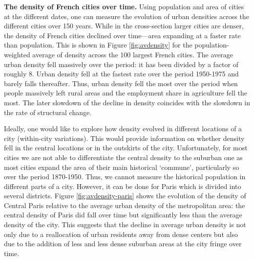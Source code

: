 \documentclass[./20250130-paper.tex]{subfiles}
\begin{document}
\textbf{The density of French cities over time.} Using population and area of cities at the different dates, one can measure the evolution of urban densities across the different cities over 150 years. While in the cross-section larger cities are denser, the density of French cities declined over time---area expanding at a faster rate than population. This is shown in Figure \ref{fig:avdensity} for the population-weighted average of density across the 100 largest French cities. The average urban density fell massively over the period: it has been divided by a factor of roughly 8. Urban density fell at the fastest rate over the period 1950-1975 and barely falls thereafter. Thus, urban density fell the most over the period when people massively left rural areas and the employment share in agriculture fell the most. The later slowdown of the decline in density coincides with the slowdown in the rate of structural change.%



Ideally, one would like to explore how density evolved in different locations of a city (within-city variations). This would provide information on whether density fell in the central locations or in the outskirts of the city. Unfortunately, for most cities we are not able to differentiate the central density to the suburban one as most cities expand the area of their main historical `commune', particularly so over the period 1870-1950. Thus, we cannot measure the historical population in different parts of a city. However, it can be done for Paris which is divided into several districts. Figure \ref{fig:avdensity-paris} shows the evolution of the density of Central Paris relative to the average urban density of the metropolitan area: the central density of Paris did fall over time but significantly less than the average density of the city. This suggests that the decline in average urban density is not only due to a reallocation of urban residents away from dense centers but also due to the addition of less and less dense suburban areas at the city fringe over time.
\end{document}
